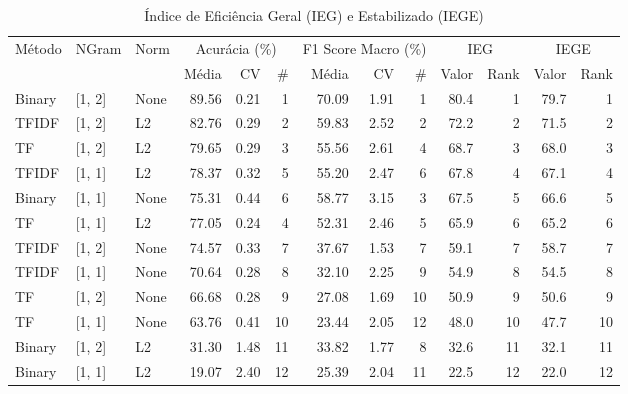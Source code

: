 \begin{table}[H]
\centering
\caption{Índice de Eficiência Geral (IEG) e Estabilizado (IEGE)}
\label{tab:Índice de Eficiência Geral (IEG) e Estabilizado (IEGE)}
\footnotesize %
\begin{tabular}{lllrrrrrrrrrr}
\hline
Método & NGram & Norm & \multicolumn{3}{c}{Acurácia (\%)} & \multicolumn{3}{c}{F1 Score Macro (\%)} & \multicolumn{2}{c}{IEG} & \multicolumn{2}{c}{IEGE} \\
& & & Média & CV & \# & Média & CV & \# & Valor & Rank & Valor & Rank \\
\hline
Binary & [1, 2] & None & 89.56 & 0.21 & 1 & 70.09 & 1.91 & 1 & 80.4 & 1 & 79.7 & 1 \\
TFIDF & [1, 2] & L2 & 82.76 & 0.29 & 2 & 59.83 & 2.52 & 2 & 72.2 & 2 & 71.5 & 2 \\
TF & [1, 2] & L2 & 79.65 & 0.29 & 3 & 55.56 & 2.61 & 4 & 68.7 & 3 & 68.0 & 3 \\
TFIDF & [1, 1] & L2 & 78.37 & 0.32 & 5 & 55.20 & 2.47 & 6 & 67.8 & 4 & 67.1 & 4 \\
Binary & [1, 1] & None & 75.31 & 0.44 & 6 & 58.77 & 3.15 & 3 & 67.5 & 5 & 66.6 & 5 \\
TF & [1, 1] & L2 & 77.05 & 0.24 & 4 & 52.31 & 2.46 & 5 & 65.9 & 6 & 65.2 & 6 \\
TFIDF & [1, 2] & None & 74.57 & 0.33 & 7 & 37.67 & 1.53 & 7 & 59.1 & 7 & 58.7 & 7 \\
TFIDF & [1, 1] & None & 70.64 & 0.28 & 8 & 32.10 & 2.25 & 9 & 54.9 & 8 & 54.5 & 8 \\
TF & [1, 2] & None & 66.68 & 0.28 & 9 & 27.08 & 1.69 & 10 & 50.9 & 9 & 50.6 & 9 \\
TF & [1, 1] & None & 63.76 & 0.41 & 10 & 23.44 & 2.05 & 12 & 48.0 & 10 & 47.7 & 10 \\
Binary & [1, 2] & L2 & 31.30 & 1.48 & 11 & 33.82 & 1.77 & 8 & 32.6 & 11 & 32.1 & 11 \\
Binary & [1, 1] & L2 & 19.07 & 2.40 & 12 & 25.39 & 2.04 & 11 & 22.5 & 12 & 22.0 & 12 \\
\hline
\end{tabular}
\end{table}




